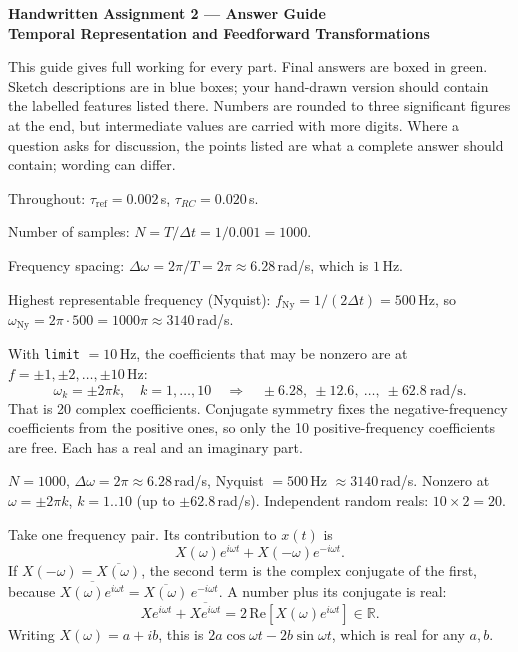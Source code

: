 \documentclass[10pt,letterpaper]{article}
\newcommand{\tref}{\tau_{\mathrm{ref}}}
\newcommand{\trc}{\tau_{RC}}
\newcommand{\qsec}[1]{\vspace{8pt}{\large\bfseries #1}\par\vspace{2pt}}
\newcommand{\ans}[1]{\par\vspace{3pt}{\bfseries #1}\quad}
\begin{document}
\begin{center}
{\Large\bfseries Handwritten Assignment 2 --- Answer Guide}\\[2pt]
{\large\bfseries Temporal Representation and Feedforward Transformations}
\end{center}

This guide gives full working for every part. Final answers are boxed in green. Sketch descriptions are in blue boxes; your hand-drawn version should contain the labelled features listed there. Numbers are rounded to three significant figures at the end, but intermediate values are carried with more digits. Where a question asks for discussion, the points listed are what a complete answer should contain; wording can differ.

Throughout: $\tref = 0.002$\,s, $\trc = 0.020$\,s.

\qsec{1. Band-limited white noise and the Fourier domain}

\ans{1a.}
Number of samples: $N = T/\Delta t = 1/0.001 = 1000$.

Frequency spacing: $\Delta\omega = 2\pi/T = 2\pi \approx 6.28$\,rad/s, which is $1$\,Hz.

Highest representable frequency (Nyquist): $f_{\mathrm{Ny}} = 1/(2\Delta t) = 500$\,Hz, so $\omega_{\mathrm{Ny}} = 2\pi \cdot 500 = 1000\pi \approx 3140$\,rad/s.

With \texttt{limit} $= 10$\,Hz, the coefficients that may be nonzero are at $f = \pm 1, \pm 2, \ldots, \pm 10$\,Hz:
\[
\omega_k = \pm 2\pi k,\quad k = 1,\ldots,10 \quad\Rightarrow\quad \pm 6.28,\ \pm 12.6,\ \ldots,\ \pm 62.8\ \text{rad/s}.
\]
That is 20 complex coefficients. Conjugate symmetry fixes the negative-frequency coefficients from the positive ones, so only the 10 positive-frequency coefficients are free. Each has a real and an imaginary part.
\begin{result}
$N = 1000$, $\Delta\omega = 2\pi \approx 6.28$\,rad/s, Nyquist $= 500$\,Hz $\approx 3140$\,rad/s. Nonzero at $\omega = \pm 2\pi k$, $k = 1..10$ (up to $\pm 62.8$\,rad/s). Independent random reals: $10 \times 2 = 20$.
\end{result}

\ans{1b.}
Take one frequency pair. Its contribution to $x(t)$ is
\[
X(\omega)e^{i\omega t} + X(-\omega)e^{-i\omega t}.
\]
If $X(-\omega) = \overline{X(\omega)}$, the second term is the complex conjugate of the first, because $\overline{X(\omega)e^{i\omega t}} = \overline{X(\omega)}\,e^{-i\omega t}$. A number plus its conjugate is real:
\[
X e^{i\omega t} + \overline{X e^{i\omega t}} = 2\,\mathrm{Re}\!\left[X(\omega)e^{i\omega t}\right] \in \mathbb{R}.
\]
Writing $X(\omega) = a + ib$, this is $2a\cos\omega t - 2b\sin\omega t$, which is real for any $a, b$.
\end{document}

